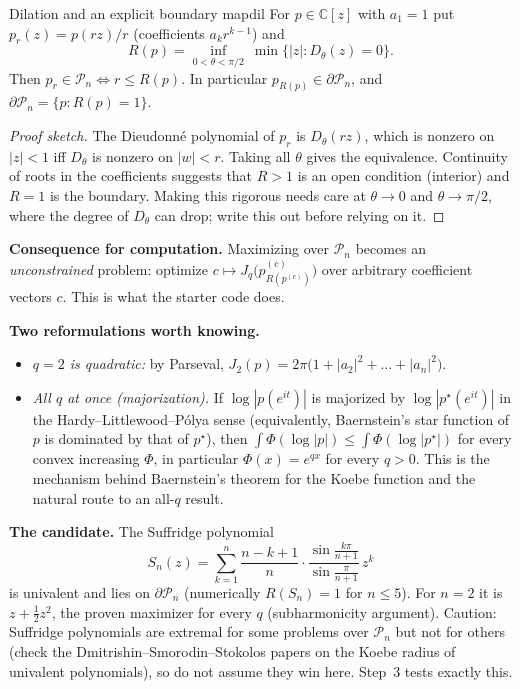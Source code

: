 \documentclass[11pt]{article}
\newcommand{\C}{\mathbb{C}}
\newcommand{\Pn}{\mathcal P_n}
\begin{document}
\begin{lemma}{Dilation and an explicit boundary map}{dil}
For $p\in\C[z]$ with $a_1=1$ put $p_r(z)=p(rz)/r$ (coefficients $a_kr^{k-1}$) and
\[
R(p)=\inf_{0<\theta<\pi/2}\ \min\{|z|:D_\theta(z)=0\}.
\]
Then $p_r\in\Pn\iff r\le R(p)$. In particular $p_{R(p)}\in\partial\Pn$, and $\partial\Pn=\{p:R(p)=1\}$.
\end{lemma}
\begin{proof}[Proof sketch]
The Dieudonné polynomial of $p_r$ is $D_\theta(rz)$, which is nonzero on $|z|<1$ iff $D_\theta$ is nonzero on $|w|<r$. Taking all $\theta$ gives the equivalence. Continuity of roots in the coefficients suggests that $R>1$ is an open condition (interior) and $R=1$ is the boundary. Making this rigorous needs care at $\theta\to0$ and $\theta\to\pi/2$, where the degree of $D_\theta$ can drop; write this out before relying on it.
\end{proof}

\textbf{Consequence for computation.} Maximizing over $\Pn$ becomes an \emph{unconstrained} problem: optimize $c\mapsto J_q\bigl(p^{(c)}_{R(p^{(c)})}\bigr)$ over arbitrary coefficient vectors $c$. This is what the starter code does.

\textbf{Two reformulations worth knowing.}
\begin{itemize}[nosep]
\item \emph{$q=2$ is quadratic:} by Parseval, $J_2(p)=2\pi\bigl(1+|a_2|^2+\dots+|a_n|^2\bigr)$.
\item \emph{All $q$ at once (majorization).} If $\log|p(e^{it})|$ is majorized by $\log|p^\star(e^{it})|$ in the Hardy--Littlewood--Pólya sense (equivalently, Baernstein's star function of $p$ is dominated by that of $p^\star$), then $\int\Phi(\log|p|)\le\int\Phi(\log|p^\star|)$ for every convex increasing $\Phi$, in particular $\Phi(x)=e^{qx}$ for every $q>0$. This is the mechanism behind Baernstein's theorem for the Koebe function and the natural route to an all-$q$ result.
\end{itemize}

\textbf{The candidate.} The Suffridge polynomial
\[
S_n(z)=\sum_{k=1}^n\frac{n-k+1}{n}\cdot\frac{\sin\frac{k\pi}{n+1}}{\sin\frac{\pi}{n+1}}\,z^k
\]
is univalent and lies on $\partial\Pn$ (numerically $R(S_n)=1$ for $n\le5$). For $n=2$ it is $z+\tfrac12z^2$, the proven maximizer for every $q$ (subharmonicity argument). Caution: Suffridge polynomials are extremal for some problems over $\Pn$ but not for others (check the Dmitrishin--Smorodin--Stokolos papers on the Koebe radius of univalent polynomials), so do not assume they win here. Step~3 tests exactly this.
\end{document}
